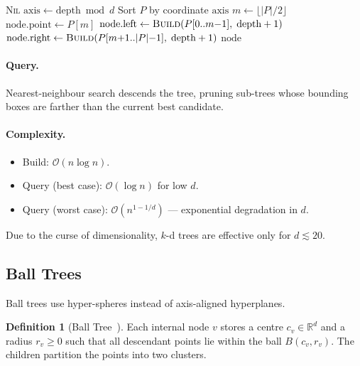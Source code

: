 \documentclass[11pt,a4paper]{article}
\theoremstyle{definition}
\newtheorem{definition}{Definition}[section]
\newcommand{\R}{\mathbb{R}}
\newcommand{\calO}{\mathcal{O}}
\begin{document}
\begin{algorithm}[H]
\caption{$k$-d Tree Construction}
\begin{algorithmic}[1]
   \Return \textsc{Nil} \EndIf
  \State $\mathrm{axis} \gets \mathrm{depth} \bmod d$
  \State Sort $P$ by coordinate $\mathrm{axis}$
  \State $m \gets \lfloor |P|/2 \rfloor$ 
  \State $\mathrm{node.point} \gets P[m]$
  \State $\mathrm{node.left} \gets \Call{Build}{P[0..m{-}1],\;\mathrm{depth}+1}$
  \State $\mathrm{node.right} \gets \Call{Build}{P[m{+}1..|P|{-}1],\;\mathrm{depth}+1}$
  \State \Return $\mathrm{node}$
\EndFunction
\end{algorithmic}
\end{algorithm}

\paragraph{Query.} Nearest-neighbour search descends the tree, pruning
sub-trees whose bounding boxes are farther than the current best
candidate.

\paragraph{Complexity.}
\begin{itemize}[nosep]
  \item Build: $\calO(n\log n)$.
  \item Query (best case): $\calO(\log n)$ for low $d$.
  \item Query (worst case): $\calO(n^{1-1/d})$ --- exponential
    degradation in $d$.
\end{itemize}

Due to the curse of dimensionality, $k$-d trees are effective only for
$d \lesssim 20$.

\subsection{Ball Trees}

Ball trees use hyper-spheres instead of axis-aligned hyperplanes.

\begin{definition}[Ball Tree~\cite{omohundro1989balltree}]
Each internal node $v$ stores a centre $c_v \in \R^d$ and a radius
$r_v \geq 0$ such that all descendant points lie within the ball
$B(c_v, r_v)$.  The children partition the points into two clusters.
\end{definition}
\end{document}
